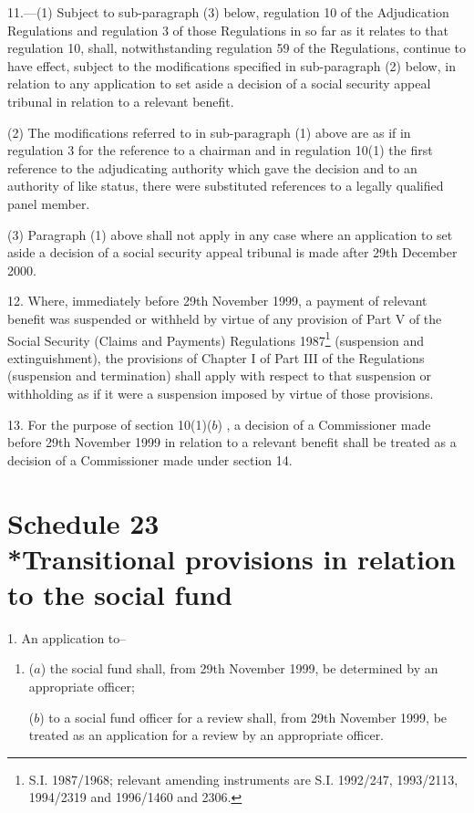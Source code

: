 \documentclass[12pt,a4paper]{article}
\begin{document}
\medskip

11.---(1)  Subject to sub-paragraph (3) below, regulation 10 of the Adjudication Regulations and regulation 3 of those Regulations in so far as it relates to that regulation 10, shall, notwithstanding regulation 59 of the Regulations, continue to have effect, subject to the modifications specified in sub-paragraph (2) below, in relation to any application to set aside a decision of a social security appeal tribunal in relation to a relevant benefit.

(2) The modifications referred to in sub-paragraph (1) above are as if in regulation 3 for the reference to a chairman and in regulation 10(1) the first reference to the adjudicating authority which gave the decision and to an authority of like status, there were substituted references to a legally qualified panel member.

(3) Paragraph (1) above shall not apply in any case where an application to set aside a decision of a social security appeal tribunal is made after 29th December 2000.

\medskip

12.  Where, immediately before 29th November 1999, a payment of relevant benefit was suspended or withheld by virtue of any provision of Part V of the Social Security (Claims and Payments) Regulations 1987\footnote{\frenchspacing S.I. 1987/1968; relevant amending instruments are S.I. 1992/247, 1993/2113, 1994/2319 and 1996/1460 and 2306.} (suspension and extinguishment), the provisions of Chapter I of Part III of the Regulations (suspension and termination) shall apply with respect to that suspension or withholding as if it were a suspension imposed by virtue of those provisions.

\medskip

13.  For the purpose of section 10(1)($b$) , a decision of a Commissioner made before 29th November 1999 in relation to a relevant benefit shall be treated as a decision of a Commissioner made under section 14.

\part[Schedule 23 --- Transitional provisions in relation to the social fund]{Schedule 23\\*Transitional provisions in relation to the social fund}

\renewcommand\parthead{--- Schedule 23}

1.  An application to–
\begin{enumerate}\item[]
($a$) the social fund shall, from 29th November 1999, be determined by an appropriate officer;

($b$) to a social fund officer for a review shall, from 29th November 1999, be treated as an application for a review by an appropriate officer.
\end{enumerate}
\end{document}
